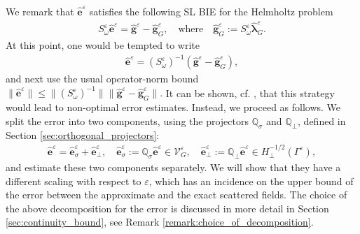 \documentclass[]{article}
\numberwithin{equation}{section}
\numberwithin{theorem}{section}
\numberwithin{lemma}{section}
\numberwithin{corollary}{section}
\numberwithin{proposition}{section}
\numberwithin{definition}{section}
\newcommand{\re}{\varepsilon}
\renewcommand{\vec}{\boldsymbol}
\begin{document}
	We remark that $\hat{\vec{e}}^{\re}$ satisfies the following SL BIE for the Helmholtz problem
	\begin{align}
		\label{eq:BIE_density_error}
		S^{\re}_{\omega} \hat{\vec{e}}^{\re} = \hat{\vec{g}}^{\re}  - \hat{\vec{g}}^{\re}_G, \quad \text{where} \quad \hat{\vec{g}}^{\re}_G := S^{\re}_{\omega} \hat{\vec{\lambda}}^{\re}_G.
	\end{align}
	At this point, one would be tempted to write 
	\begin{align}
		\label{eq:ere}
		\hat{\vec{e}}^{\re}=\left(S_{\omega}^{\re}\right)^{-1}(\hat{\vec{g}}^{\re}-\hat{\vec{g}}_G^{\re}),
	\end{align}
	and next use the usual operator-norm bound
	$%
	\|\hat{\vec{e}}^{\re}\| \leq \|(S_{\omega}^{\re})^{-1}\|\|\hat{\vec{g}}^{\re}-\hat{\vec{g}}_G^{\re}\|.
	$
	It can be shown, cf. \cite{MK}, that this strategy would lead to non-optimal error estimates. Instead, we proceed as follows. We split the error into two components, using the projectors  $\mathbb{Q}_{\sigma}$ and $\mathbb{Q}_{\perp}$, defined in Section \ref{sec:orthogonal_projectors}:
	\begin{align}
		\label{eq:splitting_density_errorr}
		\hat{\vec{e}}^{\re} =  \hat{\vec{e}}^{\re}_{\sigma} + \hat{\vec{e}}^{\re}_{\perp}, \quad \hat{\vec{e}}^{\re}_{\sigma}:=\mathbb{Q}_{\sigma} \hat{\vec{e}}^{\re} \in \mathcal{V}^{\re}_G, \quad  \hat{\vec{e}}^{\re}_{\perp}:=  \mathbb{Q}_{\perp} \hat{\vec{e}}^{\re}  \in H^{-1/2}_{\perp}(\Gamma^{\re}),
	\end{align}
	and estimate these two components separately. We will show that they have a different scaling with respect to $\re$, which has an incidence on the upper bound of the error between the approximate and the exact scattered fields. The choice of the above decomposition for the error is discussed in more detail in Section \ref{sec:continuity_bound}, see Remark \ref{remark:choice_of_decomposition}.
	
\end{document}
